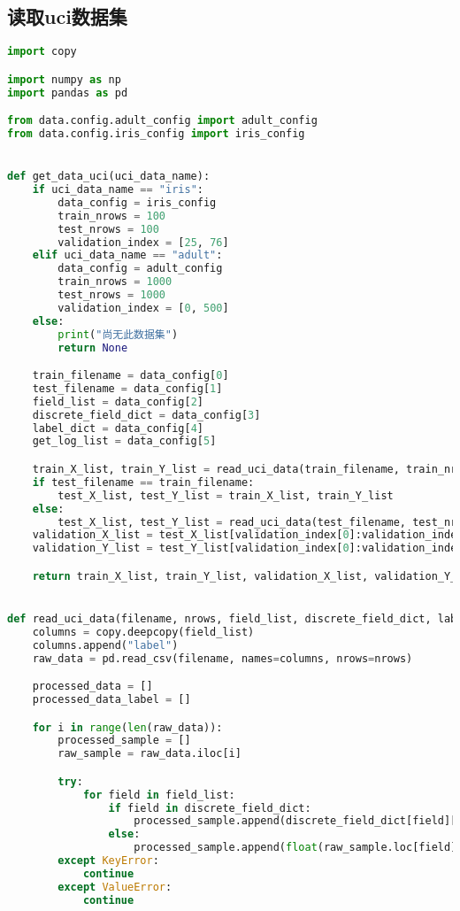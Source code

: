 \documentclass[withoutpreface,bwprint]{cumcmthesis}
\begin{document}
\begin{appendix}
\section{读取uci数据集}
\begin{lstlisting}[language=python]
import copy

import numpy as np
import pandas as pd

from data.config.adult_config import adult_config
from data.config.iris_config import iris_config


def get_data_uci(uci_data_name):
    if uci_data_name == "iris":
        data_config = iris_config
        train_nrows = 100
        test_nrows = 100
        validation_index = [25, 76]
    elif uci_data_name == "adult":
        data_config = adult_config
        train_nrows = 1000
        test_nrows = 1000
        validation_index = [0, 500]
    else:
        print("尚无此数据集")
        return None

    train_filename = data_config[0]
    test_filename = data_config[1]
    field_list = data_config[2]
    discrete_field_dict = data_config[3]
    label_dict = data_config[4]
    get_log_list = data_config[5]

    train_X_list, train_Y_list = read_uci_data(train_filename, train_nrows, field_list, discrete_field_dict, label_dict, get_log_list)
    if test_filename == train_filename:
        test_X_list, test_Y_list = train_X_list, train_Y_list
    else:
        test_X_list, test_Y_list = read_uci_data(test_filename, test_nrows, field_list, discrete_field_dict, label_dict, get_log_list)
    validation_X_list = test_X_list[validation_index[0]:validation_index[1]]
    validation_Y_list = test_Y_list[validation_index[0]:validation_index[1]]

    return train_X_list, train_Y_list, validation_X_list, validation_Y_list, test_X_list, test_Y_list


def read_uci_data(filename, nrows, field_list, discrete_field_dict, label_dict, get_log_list):
    columns = copy.deepcopy(field_list)
    columns.append("label")
    raw_data = pd.read_csv(filename, names=columns, nrows=nrows)

    processed_data = []
    processed_data_label = []

    for i in range(len(raw_data)):
        processed_sample = []
        raw_sample = raw_data.iloc[i]

        try:
            for field in field_list:
                if field in discrete_field_dict:
                    processed_sample.append(discrete_field_dict[field][raw_sample.loc[field]])
                else:
                    processed_sample.append(float(raw_sample.loc[field]))
        except KeyError:
            continue
        except ValueError:
            continue


\end{lstlisting}
\end{appendix}
\end{document}
